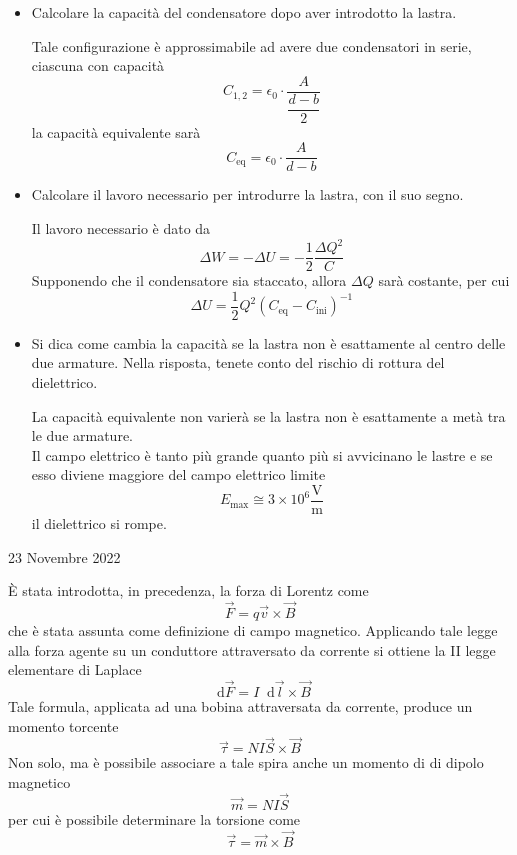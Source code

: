 \documentclass[a4paper]{extarticle}
\newcommand\dif{\mathop{}\!\mathrm{d}}
\begin{document}
\begin{itemize}
  \item Calcolare la capacità del condensatore dopo aver introdotto la lastra.

  \vspace{1em}
  \noindent
  Tale configurazione è approssimabile ad avere due condensatori in serie, ciascuna con capacità
  \[C_{1,2} = \epsilon_0 \cdot \dfrac{A}{\dfrac{d-b}{2}}\]
  la capacità equivalente sarà
  \[C_\text{eq} = \epsilon_0 \cdot \dfrac{A}{d-b}\]

  \item Calcolare il lavoro necessario per introdurre la lastra, con il suo segno.
  
  \vspace{1em}
  \noindent
  Il lavoro necessario è dato da
  \[\Delta W = - \Delta U = -\dfrac{1}{2} \dfrac{\Delta Q^2}{C}\]
  Supponendo che il condensatore sia staccato, allora $\Delta Q$ sarà costante, per cui
  \[\Delta U = \dfrac{1}{2} Q^2 (C_\text{eq} - C_\text{ini})^{-1}\]

  \item Si dica come cambia la capacità se la lastra non è esattamente al centro delle due armature. Nella risposta, tenete conto del rischio di rottura del dielettrico.

  \vspace{1em}
  \noindent
  La capacità equivalente non varierà se la lastra non è esattamente a metà tra le due armature.\\
  Il campo elettrico è tanto più grande quanto più si avvicinano le lastre e se esso diviene maggiore del campo elettrico limite
  \[E_{\max} \cong 3 \times 10^6 \dfrac{\text{V}}{\text{m}}\]
  il dielettrico si rompe.
\end{itemize}

\newpage
\noindent
\begin{center}
  23 Novembre 2022
\end{center}
È stata introdotta, in precedenza, la forza di Lorentz come
\[\vec F = q \vec v \times \vec B\]
che è stata assunta come definizione di campo magnetico. Applicando tale legge alla forza agente su un conduttore attraversato da corrente si ottiene la II legge elementare di Laplace
\[\dif \vec F = I \dif \vec l \times \vec B\]
Tale formula, applicata ad una bobina attraversata da corrente, produce un momento torcente
\[\vec \tau = NI \vec S \times \vec B\]
Non solo, ma è possibile associare a tale spira anche un momento di di dipolo magnetico
\[\vec m = N I \vec S\]
per cui è possibile determinare la torsione come
\[\vec \tau = \vec m \times \vec B\]
\end{document}

